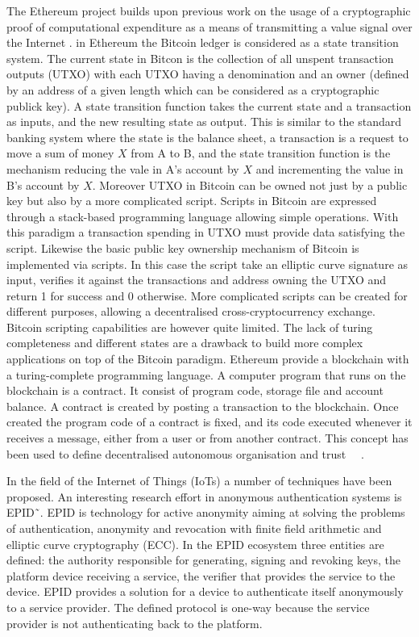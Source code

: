 The Ethereum project builds upon previous work on the usage of a cryptographic proof of computational expenditure as a means of transmitting a value signal over the Internet \cite{buterin2014next}. in Ethereum the Bitcoin ledger is considered as a state transition system. The current state in Bitcon is the collection of all unspent transaction outputs (UTXO) with each UTXO having a denomination and an owner (defined by an address of a given length which can be considered as a cryptographic publick key). A state transition function takes the current state and a transaction as inputs, and the new resulting state as output. This is similar to the standard banking system where the state is the balance sheet, a transaction is a request to move a sum of money $X$ from A to B, and the state transition function is the mechanism reducing the vale in A's account by $X$ and incrementing the value in B's account by $X$.
Moreover UTXO in Bitcoin can be owned not just by a public key but also by a more complicated script. Scripts in Bitcoin are expressed through a stack-based programming language allowing simple operations. With this paradigm a transaction spending in UTXO must provide data satisfying the script. Likewise the basic public key ownership mechanism of Bitcoin is implemented via scripts. In this case the script take an elliptic curve signature as input, verifies it against the transactions and address owning the UTXO and return 1 for success and 0 otherwise. More complicated scripts can be created for different purposes, allowing a decentralised cross-cryptocurrency exchange. Bitcoin scripting capabilities are however quite limited. The lack of turing completeness and different states are a drawback to build more complex applications on top of the Bitcoin paradigm.
Ethereum provide a blockchain with a turing-complete programming language. A computer program that runs on the blockchain is a contract. It consist of program code, storage file and account balance. A contract is created by posting a transaction to the blockchain. Once created the program code of a contract is fixed, and its code executed whenever it receives a message, either from a user or from another contract. This concept has been used to define decentralised autonomous organisation and trust ~\cite{slockit}~\cite{kosba2016hawk}.

In the field of the Internet of Things (IoTs) a number of techniques have been proposed. An interesting research effort in anonymous authentication systems is EPID˜\cite{ruan2014privacy}. EPID is technology for active anonymity aiming at solving the problems of authentication, anonymity and revocation with finite field arithmetic and elliptic curve cryptography (ECC). In the EPID ecosystem three entities are defined: the authority responsible for generating, signing and revoking keys, the platform device receiving a service, the verifier that provides the service to the device. EPID provides a solution for a device to authenticate itself anonymously to a service provider. The defined protocol is one-way because the service provider is not authenticating back to the platform. 

